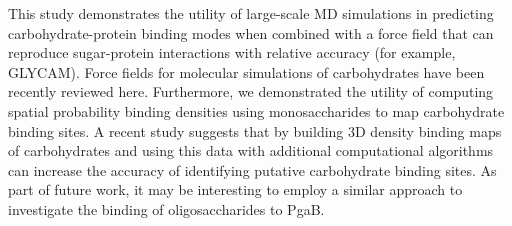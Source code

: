 


This study demonstrates the utility of large-scale MD simulations in predicting carbohydrate-protein binding modes when combined with a force field that can reproduce sugar-protein interactions with relative accuracy (for example, GLYCAM\cite{Kirschner:2008ii}). Force fields for molecular simulations of carbohydrates have been recently reviewed here.\cite{Fadda:2010p5889}  Furthermore, we demonstrated the utility of computing spatial probability binding densities using monosaccharides to map carbohydrate binding sites. A recent study suggests that by building 3D density binding maps of carbohydrates and using this data with additional computational algorithms can increase the accuracy of identifying putative carbohydrate binding sites.\cite{Tsai:2012bj} As part of future work, it may be interesting to employ a similar approach to investigate the binding of oligosaccharides to PgaB.  

